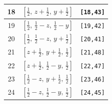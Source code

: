 \documentclass[fleqn,8pt]{jsarticle}
\begin{document}
\begin{longtable}{ccc}
18 & $\left[ \frac{1}{2},\, z + \frac{1}{2},\, y + \frac{1}{2} \right]$ & {\tt [18,43]} \\ \hline
19 & $\left[ \frac{1}{2},\, \frac{1}{2} - z,\, \frac{1}{2} - y \right]$ & {\tt [19,42]} \\ \hline
20 & $\left[ \frac{1}{2},\, \frac{1}{2} - z,\, y + \frac{1}{2} \right]$ & {\tt [20,41]} \\ \hline
21 & $\left[ z + \frac{1}{2},\, y + \frac{1}{2},\, \frac{1}{2} \right]$ & {\tt [21,48]} \\ \hline
22 & $\left[ z + \frac{1}{2},\, \frac{1}{2} - y,\, \frac{1}{2} \right]$ & {\tt [22,47]} \\ \hline
23 & $\left[ \frac{1}{2} - z,\, y + \frac{1}{2},\, \frac{1}{2} \right]$ & {\tt [23,46]} \\ \hline
24 & $\left[ \frac{1}{2} - z,\, \frac{1}{2} - y,\, \frac{1}{2} \right]$ & {\tt [24,45]} \\
\end{longtable}
\renewcommand{\arraystretch}{1.2}
\end{document}
